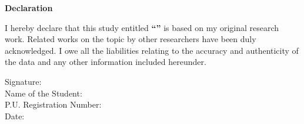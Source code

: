 \begin{titlepage}
    
    \vspace*{28pt} 
    \vspace{10pt} %

    \begin{center}
        {\fontsize{16}{20}\selectfont \textbf{Declaration}}
    \end{center}
    
    \vspace{14pt} 
    \vspace{10pt} %

    {\fontsize{12}{18}\selectfont
    \noindent
    I hereby declare that this study entitled \textbf{``\myThesisTitle''} is based on my original research work. Related works on the topic by other researchers have been duly acknowledged. I owe all the liabilities relating to the accuracy and authenticity of the data and any other information included hereunder.
    }

    \vspace*{42pt}
    \vspace{10pt} %

    \begin{flushleft}
        {\fontsize{12}{18}\selectfont
        Signature: \underline{\hspace{5cm}} \\[12pt]
        Name of the Student: \myStudentName \\[12pt]
        P.U. Registration Number: \myRegistrationNumber \\[12pt]
        Date: \underline{\hspace{5cm}}
        }
    \end{flushleft}

\end{titlepage}